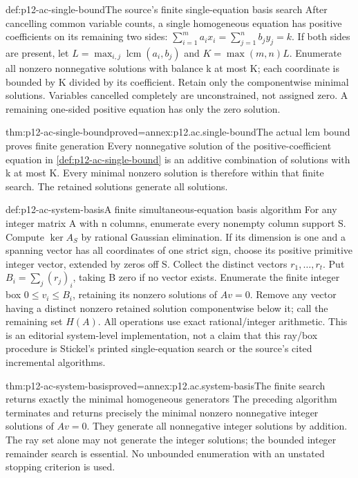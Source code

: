 \begin{hbmethod}{def:p12-ac-single-bound}{The source's finite single-equation basis search}
After cancelling common variable counts, a single homogeneous equation
has positive coefficients on its remaining two sides:
\(\sum_{i=1}^{m}a_ix_i=\sum_{j=1}^{n}b_jy_j=k\).
If both sides are present, let
\(L=\max_{i,j}\operatorname{lcm}(a_i,b_j)\) and
\(K=\max(m,n)L\). Enumerate all nonzero nonnegative solutions
with balance k at most K; each coordinate is bounded by K divided
by its coefficient. Retain only the componentwise minimal solutions.
Variables cancelled completely are unconstrained, not assigned zero.
A remaining one-sided positive equation has only the zero solution.
\cite[Lemma and algorithm, pp.~73--75]{Stickel1975AC}
\end{hbmethod}

\begin{hblemma}{thm:p12-ac-single-bound}{proved=annex:p12.ac.single-bound}{The actual lcm bound proves finite generation}
Every nonnegative solution of the positive-coefficient equation in
\cref{def:p12-ac-single-bound} is an additive combination of solutions
with k at most K. Every minimal nonzero solution is therefore within
that finite search. The retained solutions generate all solutions.
\end{hblemma}

\begin{hbmethod}{def:p12-ac-system-basis}{A finite simultaneous-equation basis algorithm}
For any integer matrix A with n columns, enumerate every nonempty column
support S. Compute \(\ker A_S\) by rational Gaussian elimination.
If its dimension is one and a spanning vector has all coordinates
of one strict sign, choose its positive primitive integer vector,
extended by zeros off S. Collect the distinct vectors \(r_1,\ldots,r_t\).
Put \(B_i=\sum_j(r_j)_i\), taking B zero if no vector exists.
Enumerate the finite integer box \(0\leq v_i\leq B_i\), retaining
its nonzero solutions of \(Av=0\). Remove any vector having a
distinct nonzero retained solution componentwise below it; call the
remaining set \(H(A)\). All operations use exact rational/integer
arithmetic. This is an editorial system-level implementation, not a
claim that this ray/box procedure is Stickel's printed single-equation
search or the source's cited incremental algorithms.
\end{hbmethod}

\begin{hbtheorem}{thm:p12-ac-system-basis}{proved=annex:p12.ac.system-basis}{The finite search returns exactly the minimal homogeneous generators}
The preceding algorithm terminates and returns precisely the minimal
nonzero nonnegative integer solutions of \(Av=0\). They generate
all nonnegative integer solutions by addition. The ray set alone may
not generate the integer solutions; the bounded integer remainder
search is essential. No unbounded enumeration with an unstated stopping
criterion is used.
\end{hbtheorem}

